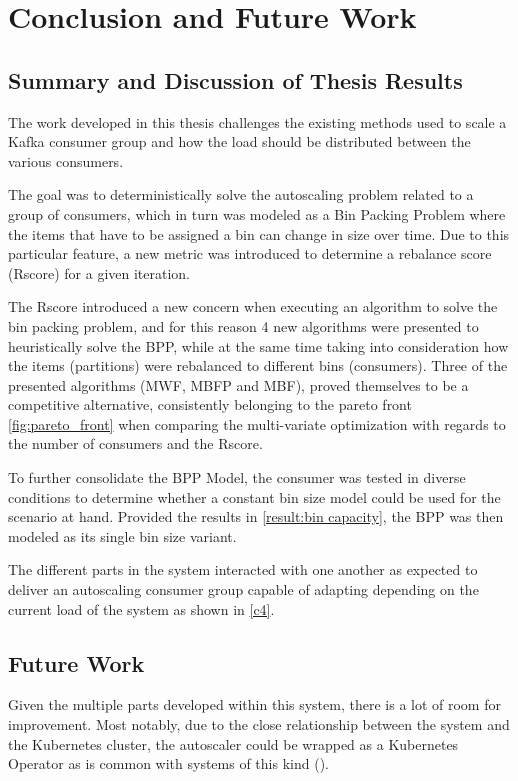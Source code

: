 \chapter{Conclusion and Future Work} \label{chap:conclusions}

\section{Summary and Discussion of Thesis Results}

The work developed in this thesis challenges the existing methods used to scale a Kafka consumer group and how the load should be distributed between the various consumers.

The goal was to deterministically solve the autoscaling problem related to a group of consumers, which in turn was modeled as a Bin Packing Problem where the items that have to be assigned a bin can change in size over time. Due to this particular feature, a new metric was introduced to determine a rebalance score (Rscore) for a given iteration. 

The Rscore introduced a new concern when executing an algorithm to solve the bin packing problem, and for this reason 4 new algorithms were presented to heuristically solve the BPP, while at the same time taking into consideration how the items (partitions) were rebalanced to different bins (consumers). Three of the presented algorithms (MWF, MBFP and MBF), proved themselves to be a competitive alternative, consistently belonging to the pareto front \ref{fig:pareto_front} when comparing the multi-variate optimization with regards to the number of consumers and the Rscore.

To further consolidate the BPP Model, the consumer was tested in diverse conditions to determine whether a constant bin size model could be used for the scenario at hand. Provided the results in \ref{result:bin capacity}, the BPP was then modeled as its single bin size variant.

The different parts in the system interacted with one another as expected to deliver an autoscaling consumer group capable of adapting depending on the current load of the system as shown in \ref{c4}.

\section{Future Work}

Given the multiple parts developed within this system, there is a lot of room for improvement. Most notably, due to the close relationship between the system and the Kubernetes cluster, the autoscaler could be wrapped as a Kubernetes Operator \cite{KuberenetesOperator} as is common with systems of this kind (\cite{Kubegres, PulumiOperator, KEDA}).

